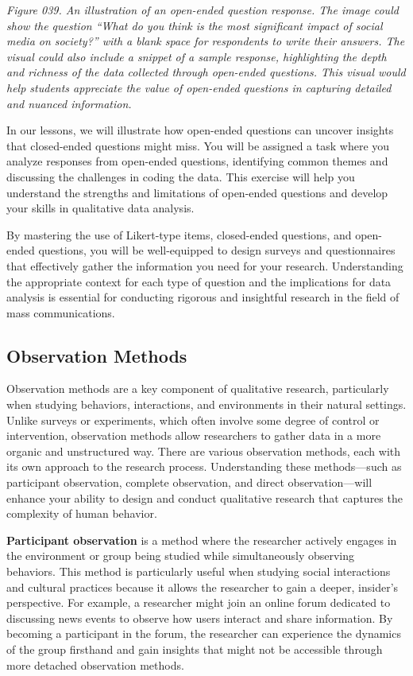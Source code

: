 \documentclass[
]{book}
\begin{document}
\emph{Figure 039. An illustration of an open-ended question response. The image could show the question ``What do you think is the most significant impact of social media on society?'' with a blank space for respondents to write their answers. The visual could also include a snippet of a sample response, highlighting the depth and richness of the data collected through open-ended questions. This visual would help students appreciate the value of open-ended questions in capturing detailed and nuanced information.}

In our lessons, we will illustrate how open-ended questions can uncover insights that closed-ended questions might miss. You will be assigned a task where you analyze responses from open-ended questions, identifying common themes and discussing the challenges in coding the data. This exercise will help you understand the strengths and limitations of open-ended questions and develop your skills in qualitative data analysis.

By mastering the use of Likert-type items, closed-ended questions, and open-ended questions, you will be well-equipped to design surveys and questionnaires that effectively gather the information you need for your research. Understanding the appropriate context for each type of question and the implications for data analysis is essential for conducting rigorous and insightful research in the field of mass communications.

\subsection{Observation Methods}\label{observation-methods}

Observation methods are a key component of qualitative research, particularly when studying behaviors, interactions, and environments in their natural settings. Unlike surveys or experiments, which often involve some degree of control or intervention, observation methods allow researchers to gather data in a more organic and unstructured way. There are various observation methods, each with its own approach to the research process. Understanding these methods---such as participant observation, complete observation, and direct observation---will enhance your ability to design and conduct qualitative research that captures the complexity of human behavior.

\textbf{Participant observation} is a method where the researcher actively engages in the environment or group being studied while simultaneously observing behaviors. This method is particularly useful when studying social interactions and cultural practices because it allows the researcher to gain a deeper, insider's perspective. For example, a researcher might join an online forum dedicated to discussing news events to observe how users interact and share information. By becoming a participant in the forum, the researcher can experience the dynamics of the group firsthand and gain insights that might not be accessible through more detached observation methods.
\end{document}

